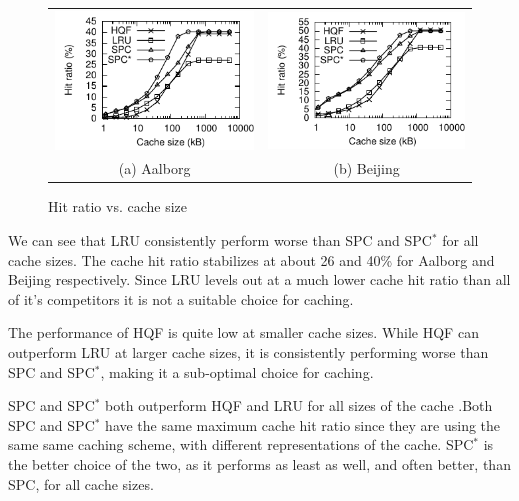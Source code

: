\begin{figure}[htb]
\center
  \begin{tabular}{@{}c@{ }c@{}}
     \includegraphics[width=0.5\columnwidth]{figures/cachesize_hitratio_aal.pdf}
     &
     \includegraphics[width=0.5\columnwidth]{figures/cachesize_hitratio_bei.pdf}
      \\
     (a) Aalborg & (b)  Beijing
     \end{tabular}
\caption{Hit ratio vs. cache size}
\label{fig:cSizeVsHitRatio}
\end{figure}

{\color{red}



We can see that LRU consistently perform worse than SPC and SPC$^*$ for all cache sizes. The cache hit ratio stabilizes at about 26 and 40\% for Aalborg and Beijing respectively. Since LRU levels out at a much lower cache hit ratio than all of it's competitors it is not a suitable choice for \spath caching.

The performance of HQF is quite low at smaller cache sizes. While HQF can outperform LRU at larger cache sizes, it is consistently performing worse than SPC and SPC$^*$, making it a sub-optimal choice for \spath caching.

SPC and SPC$^*$ both outperform HQF and LRU for all sizes of the cache .Both SPC and SPC$^*$ have the same maximum cache hit ratio since they are using the same same caching scheme, with different representations of the cache. SPC$^*$ is the better choice of the two, as it performs as least as well, and often better, than SPC, for all cache sizes. 
}





